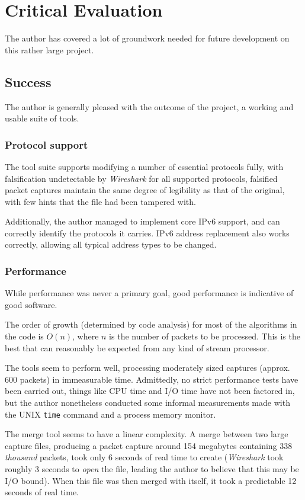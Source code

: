 \documentclass[10pt,a4paper,notitlepage]{report}
\begin{document}
\chapter{Critical Evaluation}
\label{sec:criteval}
The author has covered a lot of groundwork needed for future development on this rather large project.

\section{Success}
The author is generally pleased with the outcome of the project, a working and usable suite of tools.

\subsection{Protocol support}
The tool suite supports modifying a number of essential protocols fully, with falsification undetectable by \emph{Wireshark} for all supported protocols, falsified packet captures maintain the same degree of legibility as that of the original, with few hints that the file had been tampered with.

Additionally, the author managed to implement core IPv6 support, and can correctly identify the protocols it carries. IPv6 address replacement also works correctly, allowing all typical address types to be changed.

\subsection{Performance}
While performance was never a primary goal, good performance is indicative of good software.

The order of growth (determined by code analysis) for most of the algorithms in the code is $O(n)$, where $n$ is the number of packets to be processed. This is the best that can reasonably be expected from any kind of stream processor.

The tools seem to perform well, processing moderately sized captures (approx. 600 packets) in immeasurable time. Admittedly, no strict performance tests have been carried out, things like CPU time and I/O time have not been factored in, but the author nonetheless conducted some informal measurements made with the UNIX \texttt{time}  command and a process memory monitor.

The merge tool seems to have a linear complexity. A merge between two large capture files, producing a packet capture around 154 megabytes containing 338 \emph{thousand} packets, took only 6 seconds of real time to create (\emph{Wireshark} took roughly 3 seconds to \emph{open} the file, leading the author to believe that this may be I/O bound). When this file was then merged with itself, it took a predictable 12 seconds of real time.
\end{document}
